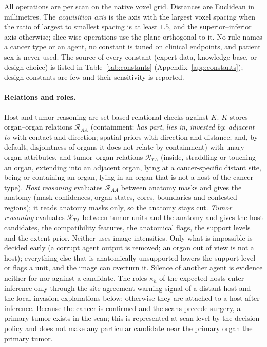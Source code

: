 \documentclass[fleqn,10pt]{olplainarticle}
\begin{document}
All operations are per scan on the native voxel grid. Distances are Euclidean in millimetres. The \emph{acquisition axis}
is the axis with the largest voxel spacing when the ratio of largest to smallest spacing is at least $1.5$, and the
superior--inferior axis otherwise; slice-wise operations use the plane orthogonal to it. No rule names a cancer type or an
agent, no constant is tuned on clinical endpoints, and patient sex is never used. The source of every constant (expert
data, knowledge base, or design choice) is listed in Table~\ref{tab:constants} (Appendix~\ref{app:constants}); design constants are few and their
sensitivity is reported.

\paragraph{Relations and roles.} Host and tumor reasoning are set-based relational checks against $K$. $K$ stores
organ--organ relations $\mathcal{R}_{AA}$ (containment: \emph{has part}, \emph{lies in}, \emph{invested by};
\emph{adjacent to} with contact and direction; spatial priors with direction and distance; and, by default, disjointness of
organs it does not relate by containment) with unary organ attributes, and tumor--organ relations $\mathcal{R}_{TA}$ (inside,
straddling or touching an organ, extending into an adjacent organ, lying at a cancer-specific distant site, being or containing
an organ, lying in an organ that is not a host of the cancer type). \emph{Host reasoning} evaluates $\mathcal{R}_{AA}$ between
anatomy masks and gives the anatomy (mask confidences, organ states, cores, boundaries and contested regions); it reads anatomy
masks only, so the anatomy stays cut. \emph{Tumor reasoning} evaluates $\mathcal{R}_{TA}$ between tumor units and the anatomy
and gives the host candidates, the compatibility features, the anatomical flags, the support levels and the extent prior.
Neither uses image intensities. Only what is impossible is decided early (a corrupt agent output is removed; an organ out of
view is not a host); everything else that is anatomically unsupported lowers the support level or flags a unit, and the image
can overturn it. Silence of another agent is evidence neither for nor against a candidate. The roles $\kappa_h$ of the expected
hosts enter inference only through the site-agreement warning signal of a distant host and the local-invasion explanations
below; otherwise they are attached to a host after inference. Because the cancer is confirmed and the scans precede surgery, a
primary tumor exists in the scan; this is represented at scan level by the decision policy and does not make any particular
candidate near the primary organ the primary tumor.
\end{document}
